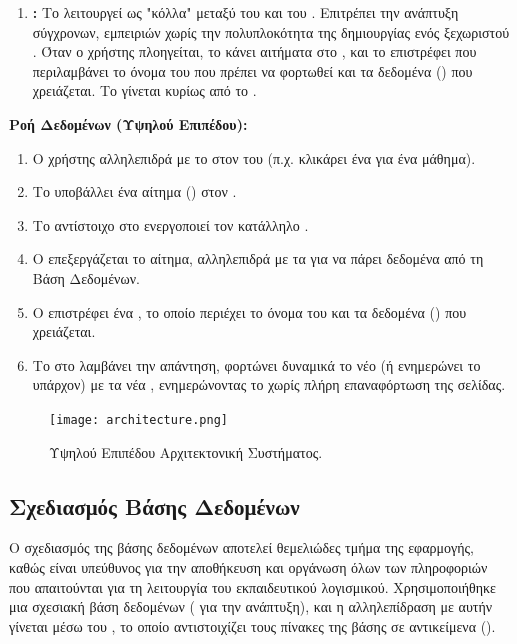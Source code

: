 \begin{enumerate}[leftmargin=*, noitemsep]
    \item \textbf{:} Το  λειτουργεί ως "κόλλα" μεταξύ του  και του . Επιτρέπει την ανάπτυξη σύγχρονων,  εμπειριών χωρίς την πολυπλοκότητα της δημιουργίας ενός ξεχωριστού . Όταν ο χρήστης πλοηγείται, το  κάνει αιτήματα  στο , και το  επιστρέφει  που περιλαμβάνει το όνομα του  που πρέπει να φορτωθεί και τα δεδομένα () που χρειάζεται. Το  γίνεται κυρίως από το .
\end{enumerate}

\textbf{Ροή Δεδομένων (Υψηλού Επιπέδου):}
\begin{enumerate}[leftmargin=*, noitemsep]
    \item Ο χρήστης αλληλεπιδρά με το  στον  του (π.χ. κλικάρει ένα  για ένα μάθημα).
    \item Το  υποβάλλει ένα αίτημα () στον .
    \item Το αντίστοιχο  στο  ενεργοποιεί τον κατάλληλο .
    \item Ο  επεξεργάζεται το αίτημα, αλληλεπιδρά με τα  για να πάρει δεδομένα από τη Βάση Δεδομένων.
    \item Ο  επιστρέφει ένα , το οποίο περιέχει το όνομα του  και τα δεδομένα () που χρειάζεται.
    \item Το  στο  λαμβάνει την απάντηση, φορτώνει δυναμικά το νέο  (ή ενημερώνει το υπάρχον) με τα νέα , ενημερώνοντας το  χωρίς πλήρη επαναφόρτωση της σελίδας.
\end{enumerate}

\begin{figure}[h!]
  \centering
  \texttt{[image: architecture.png]}
  \caption{Υψηλού Επιπέδου Αρχιτεκτονική Συστήματος.}
  \label{fig:arch_diag_placeholder_detailed}
\end{figure}

\subsection{Σχεδιασμός Βάσης Δεδομένων}
\label{sec:sxediasmos_bd_detailed}
Ο σχεδιασμός της βάσης δεδομένων αποτελεί θεμελιώδες τμήμα της εφαρμογής, καθώς είναι υπεύθυνος για την αποθήκευση και οργάνωση όλων των πληροφοριών που απαιτούνται για τη λειτουργία του εκπαιδευτικού λογισμικού. Χρησιμοποιήθηκε μια σχεσιακή βάση δεδομένων ( για την ανάπτυξη), και η αλληλεπίδραση με αυτήν γίνεται μέσω του , το οποίο αντιστοιχίζει τους πίνακες της βάσης σε αντικείμενα ().

